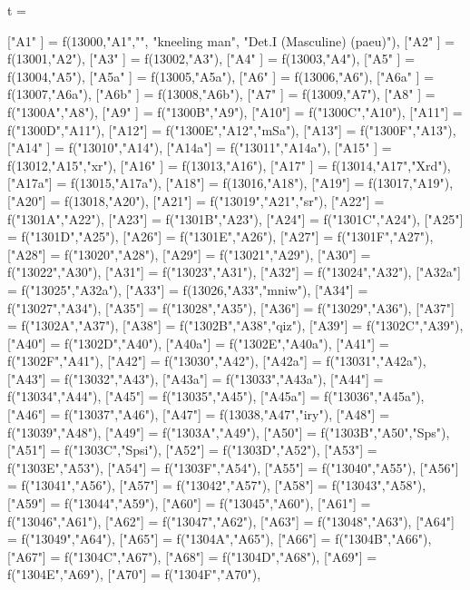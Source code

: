 \documentclass{article}
\begin{document}
\begin{luacode*}
t ={
   ["A1" 	]      =   f(13000,"A1","",
                      "kneeling man",
                      "Det.I (Masculine) (paeu)"),
   ["A2" 	] 		= f(13001,"A2"),
   ["A3" 	] 		= f(13002,"A3"),
   ["A4" 	] 		= f(13003,"A4"),
   ["A5" 	]		= f(13004,"A5"), 
   ["A5a"	] 		= f(13005,"A5a"),
   ["A6"	]		= f(13006,"A6"),
   ["A6a"	]		= f(13007,"A6a"),
   ["A6b"	]		= f(13008,"A6b"),
   ["A7"	] 		= f(13009,"A7"),
   ["A8"	] 		= f("1300A","A8"),
   ["A9" 	] 		= f("1300B","A9"),
   ["A10"] 		= f("1300C","A10"),
	["A11"] 		= f("1300D","A11"),
	["A12"] 		= f("1300E","A12","mSa"),
	["A13"] 		= f("1300F","A13"),
	["A14" ] 		= f("13010","A14"),
	["A14a"] 		= f("13011","A14a"),
  	["A15" ]		= f(13012,"A15","xr"),
  	["A16" ] 		= f(13013,"A16"),
  	["A17" ] 		= f(13014,"A17","Xrd"),
  	["A17a"] 		= f(13015,"A17a"),
  	["A18"] 		= f(13016,"A18"),
  	["A19"] 		= f(13017,"A19"),
  	["A20"] 		= f(13018,"A20"),
  	["A21"] 		= f("13019","A21","sr"),
  	["A22"] 		= f("1301A","A22"),
  	["A23"] 		= f("1301B","A23"),
  	["A24"] 		= f("1301C","A24"),
  	["A25"] 		= f("1301D","A25"),
  	["A26"] 		= f("1301E","A26"),
  	["A27"] 		= f("1301F","A27"),
  	["A28"] 		= f("13020","A28"),
  	["A29"] 		= f("13021","A29"),
  	["A30"] 		= f("13022","A30"),
  	["A31"] 		= f("13023","A31"),
  	["A32"] 		= f("13024","A32"),
 	["A32a"] 		= f("13025","A32a"),
  	["A33"] 		= f(13026,"A33","mniw"),
	["A34"] 		= f("13027","A34"),
	["A35"] 		= f("13028","A35"),
	["A36"] 		= f("13029","A36"),
	["A37"] 		= f("1302A","A37"),
	["A38"] 		= f("1302B","A38","qiz"),
	["A39"] 		= f("1302C","A39"),
	["A40"] 		= f("1302D","A40"),
	["A40a"] 		= f("1302E","A40a"),
	["A41"] 		= f("1302F","A41"),
	["A42"] 		= f("13030","A42"),
	["A42a"] 		= f("13031","A42a"),
	["A43"] 		= f("13032","A43"),
	["A43a"] 		= f("13033","A43a"),
	["A44"] 		= f("13034","A44"),
	["A45"] 		= f("13035","A45"),
	["A45a"] 		= f("13036","A45a"),
	["A46"] 		= f("13037","A46"),
  	["A47"] 		= f(13038,"A47","iry"),
	["A48"] 		= f("13039","A48"),
	["A49"] 		= f("1303A","A49"),
  	["A50"] 		= f("1303B","A50","Sps"),
  	["A51"] 		= f("1303C","Spsi"),
	["A52"] 		= f("1303D","A52"),
	["A53"] 		= f("1303E","A53"),
	["A54"] 		= f("1303F","A54"),
	["A55"] 		= f("13040","A55"),
	["A56"] 		= f("13041","A56"),
	["A57"] 		= f("13042","A57"),
	["A58"] 		= f("13043","A58"),
	["A59"] 		= f("13044","A59"),
	["A60"] 		= f("13045","A60"),
	["A61"] 		= f("13046","A61"),
	["A62"] 		= f("13047","A62"),
	["A63"] 		= f("13048","A63"),
	["A64"] 		= f("13049","A64"),
	["A65"] 		= f("1304A","A65"),
	["A66"] 		= f("1304B","A66"),
	["A67"] 		= f("1304C","A67"),
	["A68"] 		= f("1304D","A68"),
	["A69"] 		= f("1304E","A69"),
	["A70"] 		= f("1304F","A70"),

}
\end{luacode*}
\end{document}

